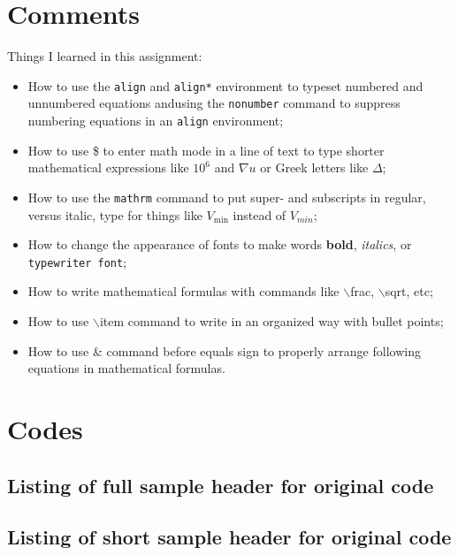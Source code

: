 \documentclass{article}
\begin{document}
\section{Comments} %
Things I learned in this assignment:
\\
\begin{itemize}
\item How to use the {\tt align} and {\tt align*} environment to typeset numbered and unnumbered equations andusing the {\tt nonumber} command to suppress numbering equations in an {\tt align} environment;
\\
\item How to use \$ to enter math mode in a line of text to type shorter mathematical expressions like  $10^6$ and $\nabla u$ or Greek letters like $\Delta$; \\

\item How to use the {\tt mathrm} command to put super- and subscripts in regular, versus italic, type for things like $V_{\mathrm{min}}$ instead of $V_{min}$;
\\
\item How to change the appearance of fonts to make words {\bf bold}, {\em italics}, or {\tt typewriter font};
\\
\item How to write mathematical formulas with commands like $\backslash$frac, $\backslash$sqrt, etc;
\\
\item How to use $\backslash$item command to write in an organized way with bullet points;
\\
\item How to use \& command before equals sign to properly arrange following equations in mathematical formulas. 
\\ 
\end{itemize}
\pagebreak
\appendix
\section{Codes}
\subsection{Listing of full sample header for original code}

\subsection{Listing of short sample header for original code}
\end{document}
